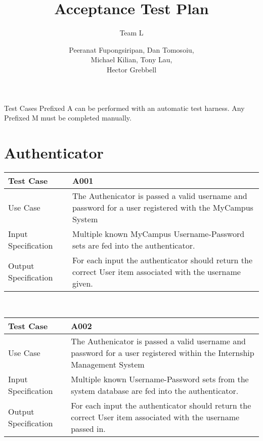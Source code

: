 \documentclass[12pt,a4paper,english,intoc,bibliography=totoc,index=totoc,BCOR10mm,captions=tableheading,titlepage,fleqn]{scrbook}
\providecommand{\tabularnewline}{\\}
\begin{document}
\subject{Professional Software Development 3}


\title{Acceptance Test Plan}


\subtitle{Team L}


\author{Peeranat Fupongsiripan, Dan Tomosoiu,\\
Michael Kilian, Tony Lau,\\
Hector Grebbell}


\publishers{\texttt{[image: Downloads/GlasgowUniTransp]}}


\dedication{This Document Describes the Acceptance Test Plan for each component
within our design of an Internship Management System for the Department
of Computing Science at the University of Glasgow. The purpose of
this acceptance test is to make sure the system developed meets its
system requirements and is suitable for all accepted use cases.}

\maketitle
Test Cases Prefixed A can be performed with an automatic test harness. Any Prefixed M must be completed manually.
\section*{Authenticator}

\begin{tabular}{lp{10cm}}
\hline 
\textbf{Test Case} & A001\tabularnewline
\hline 
\hline 
Use Case & The Authenicator is passed a valid username and password for a user
registered with the MyCampus System\tabularnewline
\hline 
Input Specification & Multiple known MyCampus Username-Password sets are fed into the authenticator.\tabularnewline
\hline 
Output Specification & For each input the authenticator should return the correct User item associated with the username given.\tabularnewline
\hline 
\end{tabular}\\

\begin{tabular}{lp{10cm}}
\hline 
\textbf{Test Case} & A002\tabularnewline
\hline 
\hline 
Use Case & The Authenicator is passed a valid username and password for a user
registered within the Internship Management System\tabularnewline
\hline 
Input Specification & Multiple known Username-Password sets from the system database are fed into the authenticator.\tabularnewline
\hline 
Output Specification & For each input the authenticator should return the correct User item associated with the username passed in.\tabularnewline
\hline 
\end{tabular}\\
\end{document}
